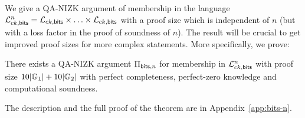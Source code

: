We give a QA-NIZK argument of membership in the language $\mathcal{L}_{ck,\mathsf{bits}}^n  = \mathcal{L}_{ck,\mathsf{bits}} \times \ldots \times \mathcal{L}_{ck,\mathsf{bits}}$ with a proof size which is independent of $n$ (but with a loss factor in the proof of soundness of $n$). The result will be crucial to get improved proof sizes for more complex statements. More specifically, we prove: 


\begin{theorem} \label{theo:bitsnm} There exists a QA-NIZK argument $\Pi_{\mathsf{bits},n}$  for membership in $\mathcal{L}_{ck,\mathsf{bits}}^n$ with proof size  
$10|\mathbb{G}_1|+10|\mathbb{G}_2|$ with perfect completeness, perfect-zero knowledge and computational soundness. 
\end{theorem}

The description and the full proof of the theorem are in Appendix~\ref{app:bits-n}. 

